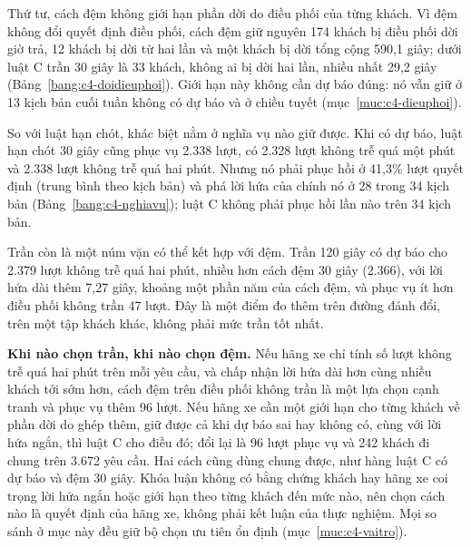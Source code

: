 Thứ tư, cách đệm không giới hạn phần dời do điều phối của từng khách. Vì đệm không đổi quyết định điều phối, cách
đệm giữ nguyên 174 khách bị điều phối dời giờ trả, 12 khách bị dời từ hai lần và một khách bị dời tổng cộng 590,1
giây; dưới luật C trần 30 giây là 33 khách, không ai bị dời hai lần, nhiều nhất 29,2 giây
(Bảng~\ref{bang:c4-doidieuphoi}). Giới hạn này không cần dự báo đúng: nó vẫn giữ ở 13 kịch bản cuối tuần không có dự
báo và ở chiều tuyết (mục~\ref{muc:c4-dieuphoi}).

So với luật hạn chót, khác biệt nằm ở nghĩa vụ nào giữ được. Khi có dự báo, luật hạn chót 30 giây cũng phục vụ
2.338 lượt, có 2.328 lượt không trễ quá một phút và 2.338 lượt không trễ quá hai phút. Nhưng nó phải phục hồi ở
41,3\% lượt quyết định (trung bình theo kịch bản) và phá lời hứa của chính nó ở 28 trong 34 kịch bản
(Bảng~\ref{bang:c4-nghiavu}); luật C không phải phục hồi lần nào trên 34 kịch bản.

Trần còn là một núm vặn có thể kết hợp với đệm. Trần 120 giây có dự báo cho 2.379 lượt không trễ quá hai phút,
nhiều hơn cách đệm 30 giây (2.366), với lời hứa dài thêm 7,27 giây, khoảng một phần năm của cách đệm, và phục vụ ít
hơn điều phối không trần 47 lượt. Đây là một điểm đo thêm trên đường đánh đổi, trên một tập khách khác, không phải
mức trần tốt nhất.

\textbf{Khi nào chọn trần, khi nào chọn đệm.} Nếu hãng xe chỉ tính số lượt không trễ quá hai phút trên mỗi yêu cầu,
và chấp nhận lời hứa dài hơn cùng nhiều khách tới sớm hơn, cách đệm trên điều phối không trần là một lựa chọn cạnh
tranh và phục vụ thêm 96 lượt. Nếu hãng xe cần một giới hạn cho từng khách về phần dời do ghép thêm, giữ được cả khi
dự báo sai hay không có, cùng với lời hứa ngắn, thì luật C cho điều đó; đổi lại là 96 lượt phục vụ và 242 khách đi
chung trên 3.672 yêu cầu. Hai cách cũng dùng chung được, như hàng luật C có dự báo và đệm 30 giây. Khóa luận không
có bằng chứng khách hay hãng xe coi trọng lời hứa ngắn hoặc giới hạn theo từng khách đến mức nào, nên chọn cách nào
là quyết định của hãng xe, không phải kết luận của thực nghiệm. Mọi so sánh ở mục này đều giữ bộ chọn ưu tiên ổn định
(mục~\ref{muc:c4-vaitro}).

